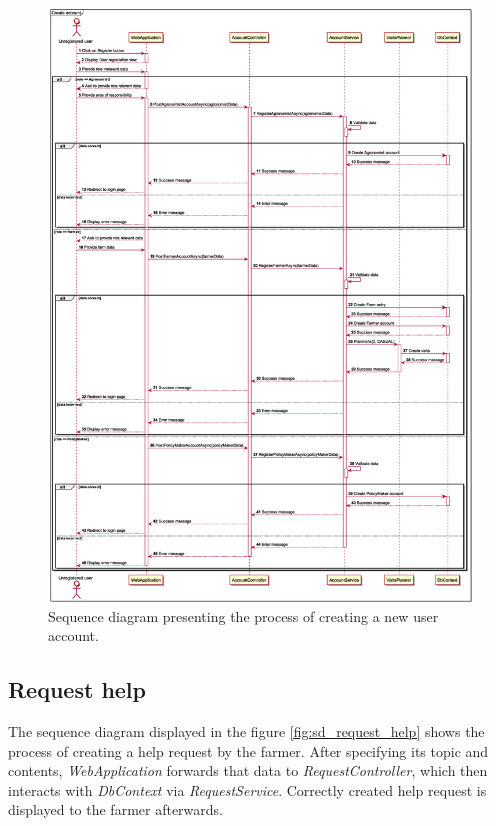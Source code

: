 \begin{figure}
    \centering
    \includegraphics[height=\textheight, width=\textwidth, keepaspectratio, origin=c]{diagrams/sequence/create_account}
    \caption{Sequence diagram presenting the process of creating a new user account.}
    \label{fig:sd_create_account}
\end{figure}

\subsection*{Request help}

The sequence diagram displayed in the figure \ref{fig:sd_request_help} shows the process of creating a help request by the farmer. After specifying its topic and contents, \textit{WebApplication} forwards that data to \textit{RequestController}, which then interacts with \textit{DbContext} via \textit{RequestService}. Correctly created help request is displayed to the farmer afterwards.

